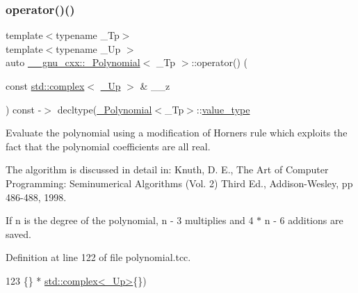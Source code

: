 \subsubsection{\texorpdfstring{operator()()}{operator()()}\hspace{0.1cm}{\footnotesize\ttfamily [1/4]}}
{\footnotesize\ttfamily template$<$typename \+\_\+\+Tp$>$ \\
template$<$typename \+\_\+\+Up $>$ \\
auto \hyperlink{class____gnu__cxx_1_1__Polynomial}{\+\_\+\+\_\+gnu\+\_\+cxx\+::\+\_\+\+Polynomial}$<$ \+\_\+\+Tp $>$\+::operator() (\begin{DoxyParamCaption}\item[{const \hyperlink{classstd_1_1complex}{std\+::complex}$<$ \hyperlink{class____gnu__cxx_1_1__Polynomial_a242114d4b86648a5dff67a8221f80d40}{\+\_\+\+Up} $>$ \&}]{\+\_\+\+\_\+z }\end{DoxyParamCaption}) const -\/$>$ decltype(\hyperlink{class____gnu__cxx_1_1__Polynomial}{\+\_\+\+Polynomial}$<$\+\_\+\+Tp$>$\+::\hyperlink{class____gnu__cxx_1_1__Polynomial_a725563351f50e76084a7a016c06f8a53}{value\+\_\+type}}

Evaluate the polynomial using a modification of Horner\textquotesingle{}s rule which exploits the fact that the polynomial coefficients are all real.

The algorithm is discussed in detail in\+: Knuth, D. E., The Art of Computer Programming\+: Seminumerical Algorithms (Vol. 2) Third Ed., Addison-\/\+Wesley, pp 486-\/488, 1998.

If n is the degree of the polynomial, n -\/ 3 multiplies and 4 $\ast$ n -\/ 6 additions are saved. 

Definition at line 122 of file polynomial.\+tcc.


\begin{DoxyCode}
123                                             \{\} * \hyperlink{classstd_1_1complex}{std::complex<\_Up>}\{\})
\end{DoxyCode}
\mbox{\label{class____gnu__cxx_1_1__Polynomial_a9aa91f3424896c07d51fa09950825549}} 
